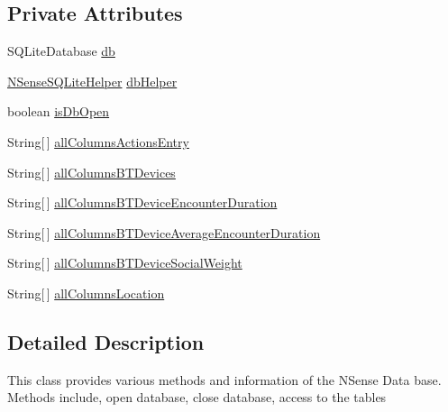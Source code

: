 \subsection*{Private Attributes}
\begin{DoxyCompactItemize}
\item 
S\-Q\-Lite\-Database \hyperlink{classcs_1_1nsense_1_1db_1_1_n_sense_data_source_aa0c89ba4ca2b5ad8ba3e7edbe0379a2c}{db}
\item 
\hyperlink{classcs_1_1nsense_1_1db_1_1_n_sense_s_q_lite_helper}{N\-Sense\-S\-Q\-Lite\-Helper} \hyperlink{classcs_1_1nsense_1_1db_1_1_n_sense_data_source_a20dfb43e35ec83f4b91472ba463d3612}{db\-Helper}
\item 
boolean \hyperlink{classcs_1_1nsense_1_1db_1_1_n_sense_data_source_a43cad7a6e5aa89f93d0f70c2424acbf9}{is\-Db\-Open}
\item 
String\mbox{[}$\,$\mbox{]} \hyperlink{classcs_1_1nsense_1_1db_1_1_n_sense_data_source_accdfc315a08687bea1f129ea1c2d1c33}{all\-Columns\-Actions\-Entry}
\item 
String\mbox{[}$\,$\mbox{]} \hyperlink{classcs_1_1nsense_1_1db_1_1_n_sense_data_source_a765fd3575a38201aa7b33b6b9f2d9272}{all\-Columns\-B\-T\-Devices}
\item 
String\mbox{[}$\,$\mbox{]} \hyperlink{classcs_1_1nsense_1_1db_1_1_n_sense_data_source_abc7aef7fd9e1c686bc6e12596e69b67f}{all\-Columns\-B\-T\-Device\-Encounter\-Duration}
\item 
String\mbox{[}$\,$\mbox{]} \hyperlink{classcs_1_1nsense_1_1db_1_1_n_sense_data_source_ab75e3d313b6e9568bb5447381ba44b95}{all\-Columns\-B\-T\-Device\-Average\-Encounter\-Duration}
\item 
String\mbox{[}$\,$\mbox{]} \hyperlink{classcs_1_1nsense_1_1db_1_1_n_sense_data_source_a61ec9073eca79d7c07ba05b3fbee4c8f}{all\-Columns\-B\-T\-Device\-Social\-Weight}
\item 
String\mbox{[}$\,$\mbox{]} \hyperlink{classcs_1_1nsense_1_1db_1_1_n_sense_data_source_a8efb5ab2f84fcd3e210496c746235c0e}{all\-Columns\-Location}
\end{DoxyCompactItemize}


\subsection{Detailed Description}
This class provides various methods and information of the N\-Sense Data base. Methods include, open database, close database, access to the tables 

